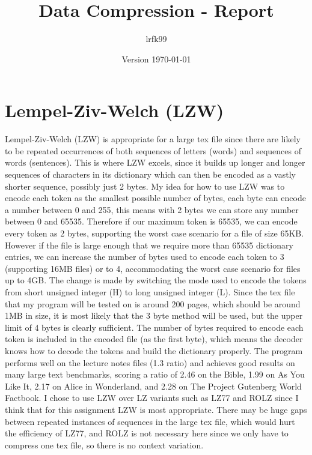 \documentclass[a4paper, 11pt]{article}
\title{Data Compression - Report}
\date{Version \today}
\author{lrfk99}
\numberwithin{equation}{section}
\begin{document}
\maketitle


\section{Lempel-Ziv-Welch (LZW)}

Lempel-Ziv-Welch (LZW) is appropriate for a large tex file since there are likely to be repeated occurrences 
of both sequences of letters (words) and sequences of words (sentences). 
This is where LZW excels, since it builds up longer and longer sequences of characters in its dictionary 
which can then be encoded as a vastly shorter sequence, possibly just 2 bytes. 
My idea for how to use LZW was to encode each token as the smallest possible number of bytes, 
each byte can encode a number between 0 and 255, this means with 2 bytes we can store any number between 
0 and 65535. 
Therefore if our maximum token is 65535, we can encode every token as 2 bytes, supporting the worst case 
scenario for a file of size 65KB. 
However if the file is large enough that we require more than 65535 dictionary entries, we can increase 
the number of bytes used to encode each token to 3 (supporting 16MB files) or to 4, accommodating the worst 
case scenario for files up to 4GB. 
The change is made by switching the mode used to encode the tokens from short unsigned integer (H) to long 
unsigned integer (L). 
Since the tex file that my program will be tested on is around 200 pages, which should be around 1MB in size, 
it is most likely that the 3 byte method will be used, but the upper limit of 4 bytes is clearly sufficient. 
The number of bytes required to encode each token is included in the encoded file (as the first byte), 
which means the decoder knows how to decode the tokens and build the dictionary properly. 
The program performs well on the lecture notes files (1.3 ratio) and achieves good results on many large 
text benchmarks, scoring a ratio of 2.46 on the Bible, 1.99 on As You Like It, 2.17 on Alice in Wonderland, 
and 2.28 on The Project Gutenberg World Factbook. 
I chose to use LZW over LZ variants such as LZ77 and ROLZ since I think that for this assignment 
LZW is most appropriate. 
There may be huge gaps between repeated instances of sequences in the large tex file, which would hurt 
the efficiency of LZ77, and ROLZ is not necessary here since we only have to compress one tex file, 
so there is no context variation. 
\end{document}

